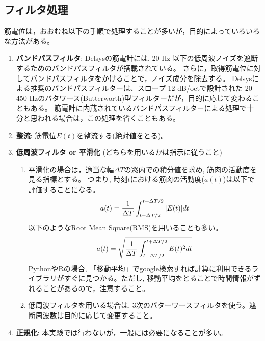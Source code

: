 \documentclass{jsarticle}
\begin{document}


\subsection{フィルタ処理}
筋電位は，おおむね以下の手順で処理することが多いが，目的によっていろいろな方法がある。

\begin{enumerate}
\item \textbf{バンドパスフィルタ}: 
Delsysの筋電計には, 20 Hz 以下の低周波ノイズを遮断するためのバンドパスフィルタが搭載されている。
さらに，取得筋電位に対してバンドパスフィルタをかけることで，ノイズ成分を除去する。
Delsysによる推奨のバンドパスフィルターは、スロープ 12 dB/octで設計された 20 - 450 Hzのバタワース(Butterworth)型フィルターだが，目的に応じて変わることもある。
筋電計に内蔵されているバンドパスフィルターによる処理で十分と思われる場合は，この処理を省くこともある。
\item \textbf{整流}: 筋電位$E(t)$を整流する(絶対値をとる)。
\item \textbf{低周波フィルタ or 平滑化} (どちらを用いるかは指示に従うこと)
  \begin{enumerate}
    \item 平滑化の場合は，適当な幅$\Delta T$の窓内での積分値を求め, 筋肉の活動度を見る指標とする。
    つまり, 時刻$t$における筋肉の活動度($a(t)$)は以下で評価することになる。
    \begin{align}
      a(t)=\frac{1}{\Delta T}\int_{t-\Delta T/2}^{t+\Delta T/2}|E(t)|dt\notag
    \end{align}
    以下のようなRoot Mean Square(RMS)を用いることも多い。
    \begin{align}
      a(t)=\sqrt{\frac{1}{\Delta T}\int_{t-\Delta T/2}^{t+\Delta T/2}E(t)^2dt}\notag
    \end{align}
    PythonやRの場合, 「移動平均」でgoogle検索すれば計算に利用できるライブラリがすぐに見つかる。ただし, 移動平均をとることで時間情報がずれることがあるので，注意すること。
    \item 低周波フィルタを用いる場合は, 3次のバターワースフィルタを使う。遮断周波数は目的に応じて変更すること。
  \end{enumerate}
\item \textbf{正規化}: 本実験では行わないが，一般には必要になることが多い。
\end{enumerate}
\end{document}
